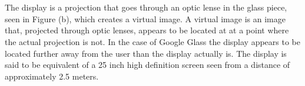 \\
\\
The display is a projection that goes through an optic lense in the glass piece, seen in Figure \label{GoogleGlassHardware} (b), which creates a virtual image. A virtual image is an image that, projected through optic lenses, appears to be located at at a point where the actual projection is not.\cite{virtualImageWiki} In the case of Google Glass the display appears to be located further away from the user than the display actually is. The display is said to be equivalent of a 25 inch high definition screen seen from a distance of approximately 2.5 meters.\cite{GlassSpecs}

%
%
%
%
%
%
%
%	
%	
%	
%
%
%
%
%
%
%
%
